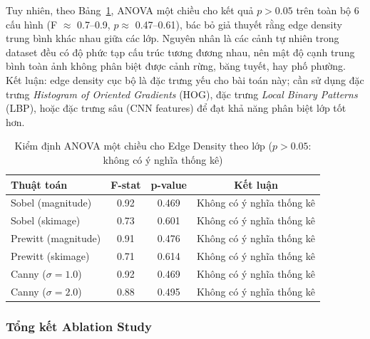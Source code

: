 Tuy nhiên, theo Bảng~\ref{tab:anova_edge}, ANOVA một chiều cho kết quả $p > 0.05$ trên toàn bộ 6 cấu hình (F $\approx$ 0.7--0.9, $p \approx$ 0.47--0.61), bác bỏ giả thuyết rằng edge density trung bình khác nhau giữa các lớp. Nguyên nhân là các cảnh tự nhiên trong dataset đều có độ phức tạp cấu trúc tương đương nhau, nên mật độ cạnh trung bình toàn ảnh không phân biệt được cảnh rừng, băng tuyết, hay phố phường. Kết luận: edge density cục bộ là đặc trưng yếu cho bài toán này; cần sử dụng đặc trưng \textit{Histogram of Oriented Gradients} (HOG), đặc trưng \textit{Local Binary Patterns} (LBP), hoặc đặc trưng sâu (CNN features) để đạt khả năng phân biệt lớp tốt hơn.
\begin{table}[H]
    \centering
    \begin{tabular}{|l|c|c|c|}
        \hline
        \textbf{Thuật toán}  & \textbf{F-stat} & \textbf{p-value} & \textbf{Kết luận}         \\
        \hline
        Sobel (magnitude)    & 0.92            & 0.469            & Không có ý nghĩa thống kê \\
        \hline
        Sobel (skimage)      & 0.73            & 0.601            & Không có ý nghĩa thống kê \\
        \hline
        Prewitt (magnitude)  & 0.91            & 0.476            & Không có ý nghĩa thống kê \\
        \hline
        Prewitt (skimage)    & 0.71            & 0.614            & Không có ý nghĩa thống kê \\
        \hline
        Canny ($\sigma=1.0$) & 0.92            & 0.469            & Không có ý nghĩa thống kê \\
        \hline
        Canny ($\sigma=2.0$) & 0.88            & 0.495            & Không có ý nghĩa thống kê \\
        \hline
    \end{tabular}
    \caption{Kiểm định ANOVA một chiều cho Edge Density theo lớp ($p > 0.05$: không có ý nghĩa thống kê)}
    \label{tab:anova_edge}
\end{table}

\subsubsection{Tổng kết Ablation Study}

